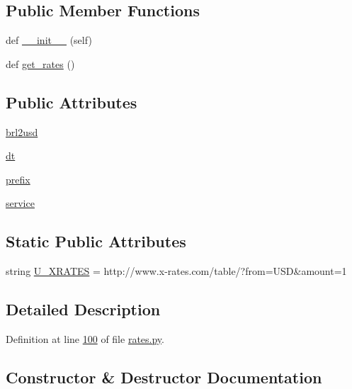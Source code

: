 \subsection*{Public Member Functions}
\begin{DoxyCompactItemize}
\item 
def \hyperlink{classrates_1_1_x_rates_a86fb4ba66a218c5f25b5b2c1f2a8345b}{\+\_\+\+\_\+init\+\_\+\+\_\+} (self)
\item 
def \hyperlink{classrates_1_1_x_rates_a034e274f1bf0a2509af2621eb27c7cce}{get\+\_\+rates} ()
\end{DoxyCompactItemize}
\subsection*{Public Attributes}
\begin{DoxyCompactItemize}
\item 
\hyperlink{classrates_1_1_x_rates_acb0a8b6ec059b823c8a46eb115341251}{brl2usd}
\item 
\hyperlink{classrates_1_1_x_rates_aa7835a0ac1d41af607d6d5885b49c131}{dt}
\item 
\hyperlink{classrates_1_1_x_rates_a3b92b41b0fbd77b44d01f094ff83dd9d}{prefix}
\item 
\hyperlink{classrates_1_1_x_rates_ad80e3c0295deaa15fac085324716747f}{service}
\end{DoxyCompactItemize}
\subsection*{Static Public Attributes}
\begin{DoxyCompactItemize}
\item 
string \hyperlink{classrates_1_1_x_rates_ab3bd64c08e6503f0d76c9f73dc38fa25}{U\+\_\+\+X\+R\+A\+T\+ES} = \textquotesingle{}http\+://www.\+x-\/rates.\+com/table/?from=U\+SD\&amount=1\textquotesingle{}
\end{DoxyCompactItemize}


\subsection{Detailed Description}


Definition at line \hyperlink{rates_8py_source_l00100}{100} of file \hyperlink{rates_8py_source}{rates.\+py}.



\subsection{Constructor \& Destructor Documentation}
\mbox{\label{classrates_1_1_x_rates_a86fb4ba66a218c5f25b5b2c1f2a8345b}} 
